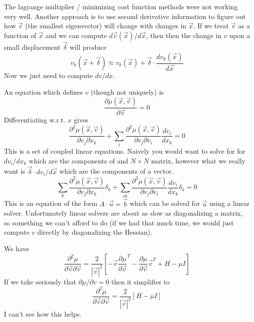 \documentclass[a4paper]{article}
\begin{document}
The lagrange multiplier / minimizing cost function methods were not working very well.  Another approach
is to use second derivative information to figure out how $\vec{v}$ (the smallest eigenvector) will change with
changes in $\vec{x}$.
If we treat $\vec{v}$ as a function of $\vec{x}$ and we can compute $d \vec{v}(\vec{x}) / d \vec{x}$, then then
the change in $v$ upon a small displacement $\vec{\delta}$ will produce
\begin{equation}
v_k(\vec{x} + \vec{\delta}) \approx v_k(\vec{x}) + \vec{\delta} \cdot \frac{d v_k(\vec{x})}{d \vec{x}}
\end{equation}
Now we just need to compute $dv / dx$.  

An equation which defines $v$ (though not uniquely) is 
\begin{equation}
\frac{\partial \mu(\vec{x}, \vec{v})}{\partial \vec{v}} = 0 
\end{equation}
Differentiating w.r.t. $x$ gives
\begin{equation}
\frac{\partial^2 \mu(\vec{x}, \vec{v})}{\partial v_j \partial x_k} + 
\sum_i \frac{\partial^2 \mu(\vec{x}, \vec{v})}{\partial v_j \partial v_i} \frac{d v_i}{d x_k} 
 = 0 
\end{equation}
This is a set of coupled linear equations.  Naively you would want to solve for for $d v_i / d x_k$ which are the components of 
and $N \times N$ matrix, however what we really want is $ \vec{\delta} \cdot dv_i / d\vec{x}$ which are the components of a vector.
\begin{equation}
\sum_k \frac{\partial^2 \mu(\vec{x}, \vec{v})}{\partial v_j \partial x_k} \delta_k + 
\sum_{ik} \frac{\partial^2 \mu(\vec{x}, \vec{v})}{\partial v_j \partial v_i} \frac{d v_i}{d x_k} \delta_k
 = 0 
\end{equation}
This is an equation of the form $A \cdot \vec{u} = \vec{b}$ which can be solved for $\vec{u}$ using a linear solver.  Unfortunately linear
solvers are about as slow as diagonalizing a matrix, so something we can't afford to do (if we had that much time, we would just compute $v$ directly
by diagonalizing the Hessian). 

We have
\begin{equation}
\frac{\partial^2 \mu}{\partial \vec{v} \partial \vec{v}} = \frac{2}{|\vec{v}|^2} \left[
-\vec{v} \frac{\partial \mu}{\partial \vec{v}}^T
-\frac{\partial \mu}{\partial \vec{v}} \vec{v}^T
+H
-\mu I
\right]
\end{equation}
If we take seriously that $\partial \mu / \partial v = 0$ then it simplifies to 
\begin{equation}
\frac{\partial^2 \mu}{\partial \vec{v} \partial \vec{v}} = \frac{2}{|\vec{v}|^2} \left[
H
-\mu I
\right]
\end{equation}
I can't see how this helps.  
\end{document}
